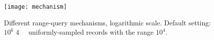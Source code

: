 \begin{figure}[!ht]
	\centering
	\texttt{[image: mechanism]}
	\caption[Different range-query mechanisms]{
		Different range-query mechanisms, logarithmic scale.
		Default setting: $10^6$ \SI{4}{\kibi\byte} uniformly-sampled records with the range $10^4$.
	}%
	\label{figure:mechanism}
\end{figure}
